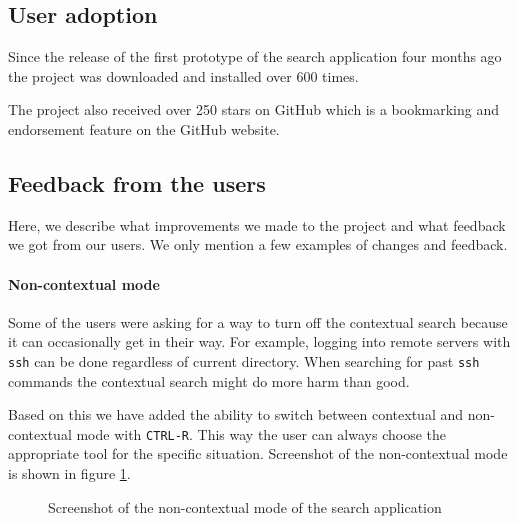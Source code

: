 \subsection{User adoption}

Since the release of the first prototype of the search application four months ago the project was downloaded and installed over 600 times. 

The project also received over 250 stars on GitHub which is a bookmarking and endorsement feature on the GitHub website.\cite{github-stars}\cite{resh-github-homepage}



\subsection{Feedback from the users}

Here, we describe what improvements we made to the project and what feedback we got from our users. We only mention a few examples of changes and feedback.

\paragraph{Non-contextual mode}

Some of the users were asking for a way to turn off the contextual search because it can occasionally get in their way. For example, logging into remote servers with \verb|ssh| can be done regardless of current directory. When searching for past \verb|ssh| commands the contextual search might do more harm than good.

Based on this we have added the ability to switch between contextual and non-contextual mode with \verb|CTRL-R|. This way the user can always choose the appropriate tool for the specific situation. Screenshot of the non-contextual mode is shown in figure \ref{xterm-resh-raw-80}.

\begin{figure}
\caption{Screenshot of the non-contextual mode of the search application}
\label{xterm-resh-raw-80}
\end{figure}

